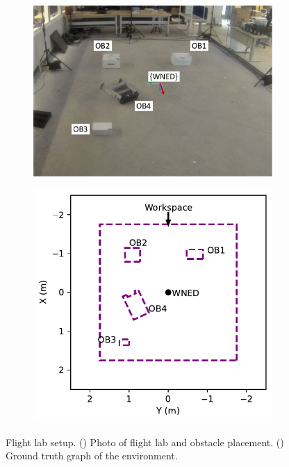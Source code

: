 \begin{figure}[!htb]
  \centering
  \begin{subfigure}[t]{.50\linewidth}
    \centering  \includegraphics[page=2,clip,trim=0cm 1cm 0cm 0cm,width=.99\linewidth]{chapter_7_experiments/imgs/ExperimentSetup.pdf}
    \caption{\label{fig:ch7_workspace_a}}
  \end{subfigure}
  \begin{subfigure}[t]{.35\linewidth}
    \centering\includegraphics[page=1,clip,trim=0cm 0cm 0cm 0cm,width=.99\linewidth]{chapter_7_experiments/imgs/workspace_plot.pdf}
    \caption{\label{fig:ch7_workspace_b}}
  \end{subfigure}
  \caption[Flight lab setup]{Flight lab setup. () Photo of flight lab and obstacle placement. () Ground truth graph of the environment.}\label{fig:ch7_workspace}
\end{figure}

